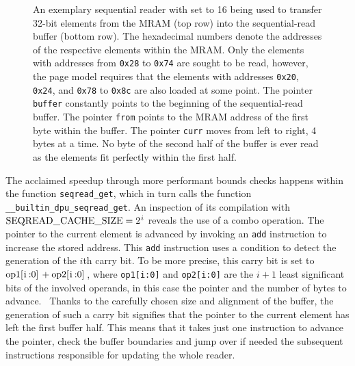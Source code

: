 \begin{figure}

	\caption{
		An exemplary sequential reader with \seqreadcachesize{} set to 16 being used to transfer 32-bit elements from the \ac{MRAM} (top row) into the sequential-read buffer (bottom row).
		The hexadecimal numbers denote the addresses of the respective elements within the \ac{MRAM}.
		Only the elements with addresses from \lstinline|0x28| to \lstinline|0x74| are sought to be read, however, the page model requires that the elements with addresses \lstinline|0x20|, \lstinline|0x24|, and \lstinline|0x78| to \lstinline|0x8c| are also loaded at some point.
		The pointer \lstinline|buffer| constantly points to the beginning of the sequential-read buffer.
		The pointer \lstinline|from| points to the \ac{MRAM} address of the first byte within the buffer.
		The pointer \lstinline|curr| moves from left to right, 4 bytes at a time.
		No byte of the second half of the buffer is ever read as the elements fit perfectly within the first half.
	}
	\label{fig:merge:reader}
\end{figure}

The acclaimed speedup through more performant bounds checks happens within the function \lstinline|seqread_get|, which in turn calls the function \lstinline|__builtin_dpu_seqread_get|.
An inspection of its compilation with \(\seqreadcachesize{} = \twotoi\) reveals the use of a combo operation.
The pointer to the current element is advanced by invoking an \lstinline|add| instruction to increase the stored address.
This \lstinline|add| instruction uses a condition to detect the generation of the \(i\)th carry bit.
To be more precise, this carry bit is set to \(\text{\lstinline|op1[i:0]|} + \text{\lstinline|op2[i:0]|}\), where \lstinline|op1[i:0]| and \lstinline|op2[i:0]| are the \(i + 1\) least significant bits of the involved operands, in this case the pointer and the number of bytes to advance.~\cite[DPU Handbook -- Specific Conditions Common To Addition and Subtraction]{upmemSDK}
Thanks to the carefully chosen size and alignment of the buffer, the generation of such a carry bit signifies that the pointer to the current element has left the first buffer half.
This means that it takes just one instruction to advance the pointer, check the buffer boundaries and jump over \Dash if needed \Dash the subsequent instructions responsible for updating the whole reader.
